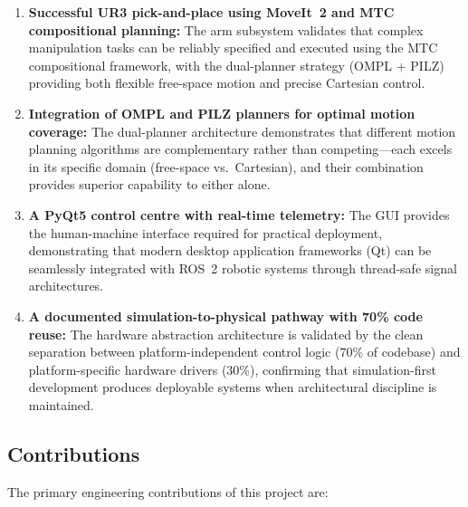 \documentclass[12pt,a4paper,oneside]{report}
\begin{document}
\begin{enumerate}
\item \textbf{Successful UR3 pick-and-place using MoveIt~2 and MTC compositional planning:} The arm subsystem validates that complex manipulation tasks can be reliably specified and executed using the MTC compositional framework, with the dual-planner strategy (OMPL + PILZ) providing both flexible free-space motion and precise Cartesian control.

\item \textbf{Integration of OMPL and PILZ planners for optimal motion coverage:} The dual-planner architecture demonstrates that different motion planning algorithms are complementary rather than competing---each excels in its specific domain (free-space vs.\ Cartesian), and their combination provides superior capability to either alone.

\item \textbf{A PyQt5 control centre with real-time telemetry:} The GUI provides the human-machine interface required for practical deployment, demonstrating that modern desktop application frameworks (Qt) can be seamlessly integrated with ROS~2 robotic systems through thread-safe signal architectures.

\item \textbf{A documented simulation-to-physical pathway with 70\% code reuse:} The hardware abstraction architecture is validated by the clean separation between platform-independent control logic (70\% of codebase) and platform-specific hardware drivers (30\%), confirming that simulation-first development produces deployable systems when architectural discipline is maintained.
\end{enumerate}

\subsection{Contributions}

The primary engineering contributions of this project are:
\end{document}
